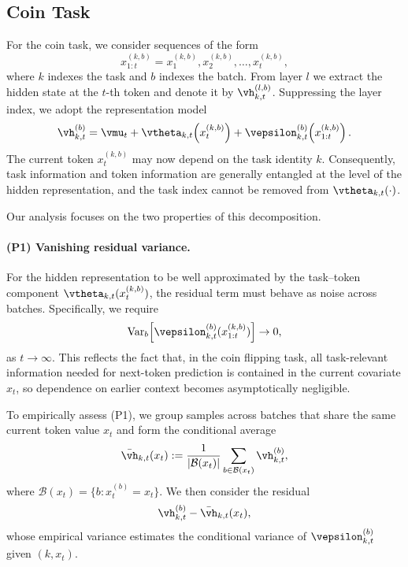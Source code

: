 \subsection{Coin Task}

For the coin task, we consider sequences of the form
\[
x^{(k,b)}_{1:t}
= x^{(k,b)}_1,
x^{(k,b)}_2,
\ldots,
x^{(k,b)}_t,
\]
where $k$ indexes the task and $b$ indexes the batch.
From layer $l$ we extract the hidden state at the $t$-th token and denote
it by $\vh^{(l,b)}_{k,t}$.
Suppressing the layer index, we adopt the representation model
\[
\vh^{(b)}_{k,t}
= \vmu_t
+ \vtheta_{k,t}\!\left(x^{(k,b)}_t\right)
+ \vepsilon^{(b)}_{k,t}\!\left(x^{(k,b)}_{1:t}\right).
\]
The current token $x^{(k,b)}_t$ may now depend on the
task identity $k$.
Consequently, task information and token information are generally entangled at the level
of the hidden representation, and the task index cannot be removed from
$\vtheta_{k,t}(\cdot)$.

Our analysis focuses on the two properties of this decomposition. 
\paragraph{(P1) Vanishing residual variance.}
For the hidden representation to be well approximated by the task--token component
$\vtheta_{k,t}(x^{(k,b)}_t)$, the residual term must behave as noise across batches.
Specifically, we require
\[
\operatorname{Var}_b\!\left[\vepsilon^{(b)}_{k,t}(x_{1:t}^{(k,b)})\right] \to 0,
\]
as $t \to \infty$.
This reflects the fact that, in the coin flipping task, all task-relevant information needed for
next-token prediction is contained in the current covariate $x_t$, so dependence on earlier
context becomes asymptotically negligible.

To empirically assess (P1), we group samples across batches that share the same current token
value $x_t$ and form the conditional average
\[
\bar{\vh}_{k,t}(x_t)
:= \frac{1}{|\mathcal{B}(x_t)|}
\sum_{b \in \mathcal{B}(x_t)} \vh^{(b)}_{k,t},
\]
where $\mathcal{B}(x_t) = \{ b : x^{(b)}_t = x_t \}$.
We then consider the residual
\[
\vh^{(b)}_{k,t} - \bar{\vh}_{k,t}(x_t),
\]
whose empirical variance estimates the conditional variance of
$\vepsilon^{(b)}_{k,t}$ given $(k, x_t)$.



